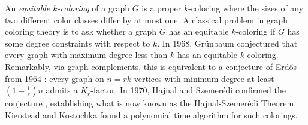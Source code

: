 \documentclass[11pt, a4paper]{article}
\theoremstyle{definition}
\newcommand{\<}{\subseteq}
\begin{document}
An \textit{equitable $k$-coloring} of a graph $G$ is a proper $k$-coloring where the sizes of any two different color classes differ by at most one.  A classical problem in graph coloring theory is to ask whether a graph $G$ has an equitable $k$-coloring if $G$ has some degree constraints with respect to $k$. In 1968, Gr\"{u}nbaum \cite{Gr1968} conjectured that every graph with maximum degree less than $k$ has an equitable $k$-coloring. Remarkably, via graph complements, this is equivalent to a conjecture of Erd\H{o}s from 1964 \cite{E1964}: every graph on $n = rk$ vertices with minimum degree at least $(1 - \frac{1}{r})n$ admits a $K_r$-factor. %
In 1970, Hajnal and Szemer\'{e}di confirmed the conjecture \cite{HS1970}, establishing what is now known as the Hajnal-Szemer\'{e}di Theorem. Kierstead and Kostochka \cite{KK-algor,KKMS2008} found a polynomial time algorithm for such colorings. 


\end{document}
